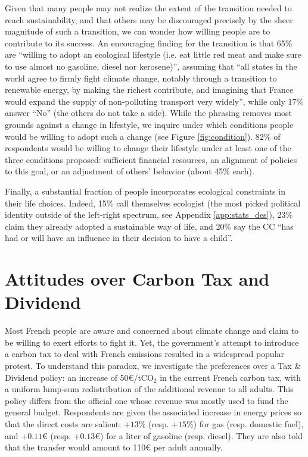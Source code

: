 \documentclass[english,5p,authoryear]{elsarticle}
\begin{document}
Given that many people may not realize the extent of the transition needed to reach sustainability, and that others may be discouraged precisely by the sheer magnitude of such a transition, we can wonder how willing people are to contribute to its success. An encouraging finding for the transition is that 65\% are ``willing to adopt an ecological lifestyle (i.e. eat little red meat and make sure to use almost no gasoline, diesel nor kerosene)'', assuming that ``all states in the world agree to firmly fight climate change, notably through a transition to renewable energy, by making the richest contribute, and imagining that France would expand the supply of non-polluting transport very widely'', while only 17\% answer ``No'' (the others do not take a side). While the phrasing removes most grounds against a change in lifestyle, we inquire under which conditions people would be willing to adopt such a change (see Figure \ref{fig:condition}). 82\% of respondents would be willing to change their lifestyle under at least one of the three conditions proposed: sufficient financial resources, an alignment of policies to this goal, or an adjustment of others' behavior (about 45\% each).
%

%

Finally, a substantial fraction of people incorporates ecological constraints in their life choices. Indeed, 15\% call themselves ecologist (the most picked political identity outside of the left-right spectrum, see Appendix \ref{app:stats_des}), 23\% claim they already adopted a sustainable way of life, and 20\% say the CC ``has had or will have an influence in their decision to have a child''. 

%

%
%
%
%


\section{Attitudes over Carbon Tax and Dividend} \label{sec:attitudes_carbon_tax}

%

%

%
Most French people are aware and concerned about climate change and claim to be willing to exert efforts to fight it. Yet, the government's attempt to introduce a carbon tax to deal with French emissions resulted in a widespread popular protest. To understand this paradox, we investigate the preferences over a Tax \& Dividend policy: an increase of 50\euro{}/tCO$_2$ in the current French carbon tax, with a uniform lump-sum redistribution of the additional revenue to all adults. This policy differs from the official one whose revenue was mostly used to fund the general budget. Respondents are given the associated increase in energy prices so that the direct costs are salient: $+13\%$ (resp. $+15\%$) for gas (resp. domestic fuel), and $+0.11$\euro{} (resp. $+0.13$\euro{}) for a liter of gasoline (resp. diesel). They are also told that the transfer would amount to 110\euro{} per adult annually. %
\end{document}
